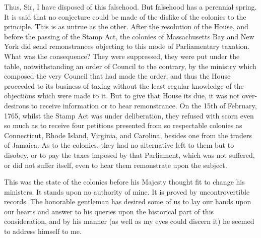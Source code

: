 Thus, Sir, I have disposed of this falsehood. But falsehood has a perennial spring. It is said that no conjecture could be made of the dislike of the colonies to the principle. This is as untrue as the other. After the resolution of the House, and before the passing of the Stamp Act, the colonies of Massachusetts Bay and New York did send remonstrances objecting to this mode of Parliamentary taxation. What was the consequence? They were suppressed, they were put under the table, notwithstanding an order of Council to the contrary, by the ministry which composed the very Council that had made the order; and thus the House proceeded to its business of taxing without the least regular knowledge of the objections which were made to it. But to give that House its due, it was not over-desirous to receive information or to hear remonstrance. On the 15th of February, 1765, whilst the Stamp Act was under deliberation, they refused with scorn even so much as to receive four petitions presented from so respectable colonies as Connecticut, Rhode Island, Virginia, and Carolina, besides one from the traders of Jamaica. As to the colonies, they had no alternative left to them but to disobey, or to pay the taxes imposed by that Parliament, which was not suffered, or did not suffer itself, even to hear them remonstrate upon the subject.

This was the state of the colonies before his Majesty thought fit to change his ministers. It stands upon no authority of mine. It is proved by uncontrovertible records. The honorable gentleman has desired some of us to lay our hands upon our hearts and answer to his queries upon the historical part of this consideration, and by his manner (as well as my eyes could discern it) he seemed to address himself to me.

